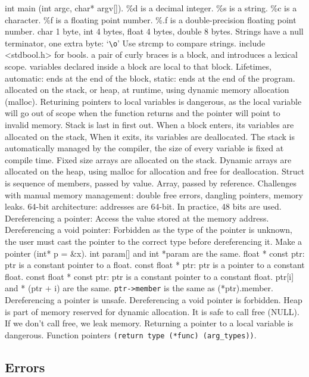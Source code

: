 \documentclass{article}
\begin{document}
int main (int argc, char* argv[]). \%d is a decimal integer. \%s is a string. \%c is a character. \%f is a floating point number.
\%.f is a double-precision floating point number.
char 1 byte, int 4 bytes, float 4 bytes, double 8 bytes.
Strings have a null terminator, one extra byte: `\texttt{\textbackslash o}'
Use strcmp to compare strings.
include \textless stdbool.h\textgreater{} for bools.
a pair of curly braces is a block, and introduces a lexical scope.
variables declared inside a block are local to that block.
Lifetimes, automatic: ends at the end of the block,
static: ends at the end of the program.
allocated on the stack, or heap, at runtime, using dynamic memory allocation (malloc).
Returining pointers to local variables is dangerous, as the local variable will go out of
scope when the function returns and the pointer will point to invalid memory.
Stack is last in first out. When a block enters, its variables are allocated on the stack,
When it exits, its variables are deallocated.
The stack is automatically managed by the compiler, the size of every variable is fixed at compile time.
Fixed size arrays are allocated on the stack.
Dynamic arrays are allocated on the heap, using malloc for allocation and free for deallocation.
Struct is sequence of members, passed by value.
Array, passed by reference.
Challenges with manual memory management: double free errors, dangling pointers, memory leaks.
64-bit architecture: addresses are 64-bit. In practice, 48 bits are used.
Dereferencing a pointer: Access the value stored at the memory address.
Dereferencing a void pointer: Forbidden as the type of the pointer is unknown, the user must cast the pointer
to the correct type before dereferencing it.
Make a pointer (int* p = \&x).
int param[] and int *param are the same.
float * const ptr: ptr is a constant pointer to a float.
const float * ptr: ptr is a pointer to a constant float.
const float * const ptr: ptr is a constant pointer to a constant float.
ptr[i] and * (ptr + i) are the same.
\texttt{ptr->member} is the same as (*ptr).member.
Dereferencing a pointer is unsafe. 
Dereferencing a void pointer is forbidden.
Heap is part of memory reserved for dynamic allocation.
It is safe to call free (NULL).
If we don't call free, we leak memory.
Returning a pointer to a local variable is dangerous.
Function pointers \texttt{(return type (*func) (arg\_types))}.

\subsection*{Errors}
\end{document}
